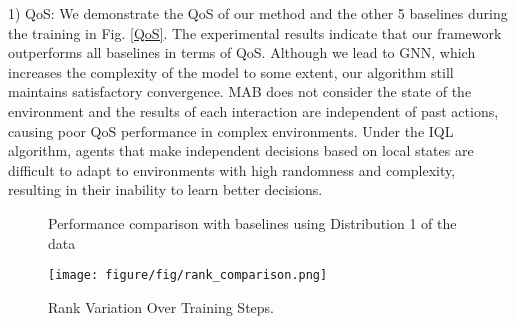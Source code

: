 1) QoS: We demonstrate the QoS of our method and the other 5 baselines during the training in Fig. \ref{QoS}. The experimental results indicate that our framework outperforms all baselines in terms of QoS. Although we lead to GNN, which increases the complexity of the model to some extent, our algorithm still maintains satisfactory convergence. MAB does not consider the state of the environment and the results of each interaction are independent of past actions, causing poor QoS performance in complex environments. Under the IQL algorithm, agents that make independent decisions based on local states are difficult to adapt to environments with high randomness and complexity, resulting in their inability to learn better decisions.


\begin{figure*}[htbp] %
	\centering  %
	\vspace{-0.35cm} %
	\subfigtopskip=2pt %
	\subfigbottomskip=2pt %
	\subfigcapskip=-5pt %
	\caption{Performance comparison with baselines using Distribution 1 of the data}
	\label{contrast}
\end{figure*}


\begin{figure}[t]
\centerline{\texttt{[image: figure/fig/rank\_comparison.png]}}
\caption{Rank Variation Over Training Steps.
}
\label{fig:rank}
\end{figure}

